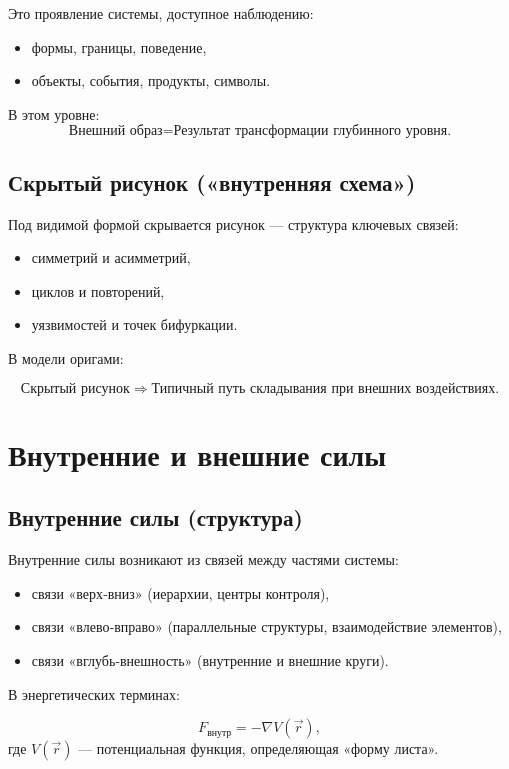 \documentclass[12pt]{article}
\begin{document}
Это проявление системы, доступное наблюдению:

\begin{itemize}
  \item формы, границы, поведение,
  \item объекты, события, продукты, символы.
\end{itemize}

В этом уровне:
\[
 \text{Внешний образ} = \text{Результат трансформации глубинного уровня.}
\]

\subsection{Скрытый рисунок («внутренняя схема»)}

Под видимой формой скрывается рисунок — структура ключевых связей:

\begin{itemize}
  \item симметрий и асимметрий,
  \item циклов и повторений,
  \item уязвимостей и точек бифуркации.
\end{itemize}

В модели оригами:

\[
 \text{Скрытый рисунок} \Rightarrow \text{Типичный путь складывания при внешних воздействиях}.
\]

\section{Внутренние и внешние силы}

\subsection{Внутренние силы (структура)}

Внутренние силы возникают из связей между частями системы:

\begin{itemize}
  \item связи «верх‑вниз» (иерархии, центры контроля),
  \item связи «влево‑вправо» (параллельные структуры, взаимодействие элементов),
  \item связи «вглубь‑внешность» (внутренние и внешние круги).
\end{itemize}

В энергетических терминах:

\[
 F_{\text{внутр}} = -\nabla V(\vec{r}),
\]
где $V(\vec{r})$ — потенциальная функция, определяющая «форму листа».
\end{document}
